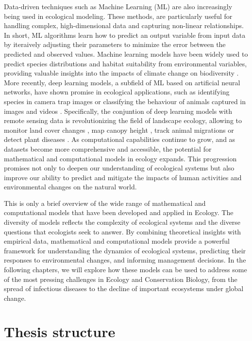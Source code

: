 Data-driven techniques such as Machine Learning (ML) are also increasingly
being used in ecological modeling. These methods, are particularly useful for
handling complex, high-dimensional data and capturing non-linear relationships.
In short, ML algorithms learn how to predict an output variable from input data
by iteraively adjusting their parameters to minimize the error between the
predicted and observed values. Machine learning models have been widely used to
predict species distributions and habitat suitability from environmental
variables, providing valuable insights into the impacts of climate change on
biodiversity \cite{Christin2019}. More recently, deep learning models, a
subfield of ML based on artificial neural networks, have shown promise in
ecological applications, such as identifying species in camera trap images
\cite{Tabak2019} or classifying the behaviour of animals captured in images and
videos \cite{Christin2019}. Specifically, the conjuntion of deep learning
models with remote sensing data is revolutionizing the field of landscape
ecology, allowing to monitor land cover changes \cite{Kussul2017}, map canopy
height \cite{Lang2023}, track animal migrations \cite{Wu2023} or detect plant
diseases \cite{Zarco-Tejada2021}. As computational capabilities continue to
grow, and as datasets become more comprehensive and accessible, the potential
for mathematical and computational models in ecology expands. This progression
promises not only to deepen our understanding of ecological systems but also
improve our ability to predict and mitigate the impacts of human activities and
environmental changes on the natural world.

This is only a brief overview of the wide range of mathematical and
computational models that have been developed and applied in Ecology. The
diversity of models reflects the complexity of ecological systems and the
diverse questions that ecologists seek to answer. By combining theoretical
insights with empirical data, mathematical and computational models provide a
powerful framework for understanding the dynamics of ecological systems,
predicting their responses to environmental changes, and informing management
decisions. In the following chapters, we will explore how these models can be
used to address some of the most pressing challenges in Ecology and
Conservation Biology, from the spread of infectious diseases to the decline of
important ecosystems under global change.

\section{\label{sec:Thesis structure} Thesis structure}

